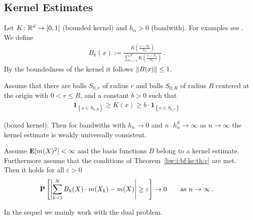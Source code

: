 \subsection*{Kernel Estimates}
Let $K\colon \mathbb{R}^d\to [0,1]$ (bounded kernel) and $h_n>0$ (bandwith).
For examples see \cite[§5.1.]{Gyorfi2002}.
We define
\begin{gather}
  B_k(x)
  :=
  \frac
  {
    K \left( \frac{x-X_k}{h_n} \right)
  }
  {
    \sum_{i=1}^{N} 
    K \left( \frac{x-X_i}{h_n} \right)
  }
  \,.
\end{gather}
By the boundedness of the kernel it follows
$\left\lVert B(x)\right\rVert\le 1$.
\begin{theorem}
  \label{bw:i:bf:ke:th:c}
  Assume that there are 
  balls
  $S_{0,r}$ of radius $r$ 
  and
  balls
  $S_{0,R}$ of radius $R$ 
  centered at the origin with $0<r\le R$, and a constant $b>0$ such that
  \begin{gather}
    \mathbf{1}_{\left\{ x\in S_{0,R} \right\}}
    \ge
    K(x)
    \ge
    b
    \cdot
    \mathbf{1}_{\left\{ x\in S_{0,r} \right\}}
  \end{gather}
\end{theorem}
(boxed kernel). Then for bandwiths with $h_n\to0$ and
$n\cdot h_n^d\to\infty$ as $n\to \infty$ the kernel estimate is weakly universally consistent.
\begin{corollary}
Assume
  $\mathbf{E}[m(X)^2]<\infty$
  and the basis functions $B$ belong to a kernel estimate.
  Furthermore assume that the conditions of 
  Theorem~\ref{bw:i:bf:ke:th:c} are met.
Then it holds for all $\varepsilon>0$
\begin{gather}
  \P
  \left[ 
    \left| 
    \sum_{k=1}^{N} 
    B_k(X)
    \cdot
    m(X_k)
    -
    m(X)
    \right|
    \ge
    \varepsilon
  \right]
  \to
  0
  \qquad
  \text{as}
  \ 
  n\to \infty
  \,.
\end{gather}
\end{corollary}

In the sequel we mainly work with the dual problem.

